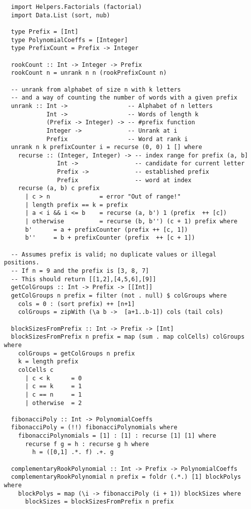 \begin{verbatim}
  import Helpers.Factorials (factorial)
  import Data.List (sort, nub)

  type Prefix = [Int]
  type PolynomialCoeffs = [Integer]
  type PrefixCount = Prefix -> Integer

  rookCount :: Int -> Integer -> Prefix
  rookCount n = unrank n n (rookPrefixCount n)

  -- unrank from alphabet of size n with k letters
  -- and a way of counting the number of words with a given prefix
  unrank :: Int ->                 -- Alphabet of n letters
            Int ->                 -- Words of length k
            (Prefix -> Integer) -> -- #prefix function
            Integer ->             -- Unrank at i
            Prefix                 -- Word at rank i
  unrank n k prefixCounter i = recurse (0, 0) 1 [] where
    recurse :: (Integer, Integer) -> -- index range for prefix (a, b]
               Int ->                -- candidate for current letter
               Prefix ->             -- established prefix
               Prefix                -- word at index
    recurse (a, b) c prefix
      | c > n              = error "Out of range!"
      | length prefix == k = prefix
      | a < i && i <= b    = recurse (a, b') 1 (prefix  ++ [c])
      | otherwise          = recurse (b, b'') (c + 1) prefix where
      b'      = a + prefixCounter (prefix ++ [c, 1])
      b''     = b + prefixCounter (prefix  ++ [c + 1])

  -- Assumes prefix is valid; no duplicate values or illegal positions.
  -- If n = 9 and the prefix is [3, 8, 7]
  -- This should return [[1,2],[4,5,6],[9]]
  getColGroups :: Int -> Prefix -> [[Int]]
  getColGroups n prefix = filter (not . null) $ colGroups where
    cols = 0 : (sort prefix) ++ [n+1]
    colGroups = zipWith (\a b ->  [a+1..b-1]) cols (tail cols)

  blockSizesFromPrefix :: Int -> Prefix -> [Int]
  blockSizesFromPrefix n prefix = map (sum . map colCells) colGroups where
    colGroups = getColGroups n prefix
    k = length prefix
    colCells c
      | c < k      = 0
      | c == k     = 1
      | c == n     = 1
      | otherwise  = 2

  fibonacciPoly :: Int -> PolynomialCoeffs
  fibonacciPoly = (!!) fibonacciPolynomials where
    fibonacciPolynomials = [1] : [1] : recurse [1] [1] where
      recurse f g = h : recurse g h where
        h = ([0,1] .*. f) .+. g

  complementaryRookPolynomial :: Int -> Prefix -> PolynomialCoeffs
  complementaryRookPolynomial n prefix = foldr (.*.) [1] blockPolys where
    blockPolys = map (\i -> fibonacciPoly (i + 1)) blockSizes where
      blockSizes = blockSizesFromPrefix n prefix


\end{verbatim}
